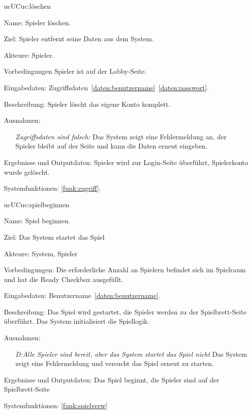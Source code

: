 \begin{description}[leftmargin=5em, style=sameline]
	\begin{lhp}{uc}{UC}{uc:löschen}
		\item [Name:] Spieler löschen.
		\item [Ziel:] Spieler entfernt seine Daten aus dem System.
		\item [Akteure:] Spieler.
		\item [Vorbedingungen] Spieler ist auf der Lobby-Seite.
		\item [Eingabedaten:] Zugriffsdaten~\ref{daten:benutzername}~\ref{daten:passwort}.
		\item [Beschreibung:] Spieler löscht das eigene Konto komplett.
		\item [Ausnahmen:] \hfill
			\begin{itemize} 
				\item[] \textit{Zugriffsdaten sind falsch:} Das System zeigt eine Fehlermeldung an, der Spieler bleibt auf der Seite und kann die Daten erneut eingeben.
			\end{itemize}
		\item [Ergebnisse und Outputdaten:] Spieler wird zur Login-Seite überführt, Spielerkonto wurde gelöscht.	
		\item [Systemfunktionen:] \ref{funk:zugriff}.
	\end{lhp}
    
    \begin{lhp}{uc}{UC}{uc:spielbeginnen}
    \item [Name:] Spiel beginnen.
    \item [Ziel:] Das System startet das Spiel
    \item [Akteure:] System, Spieler
    \item [Vorbedingungen:] Die erforderliche Anzahl an Spielern befindet sich im Spielraum und hat die Ready Checkbox ausgefüllt.
    \item [Eingabedaten:] Benutzername~\ref{daten:benutzername}.
    \item [Beschreibung:] Das Spiel wird gestartet, die Spieler werden zu der Spielbrett-Seite überführt. Das System initialisiert die Spiellogik.
    \item [Ausnahmen:] \hfill
        \begin{itemize}
            \item[] \textit{D:Alle Spieler sind bereit, aber das System startet das Spiel nicht} Das System zeigt eine Fehlermeldung und versucht das Spiel erneut zu starten.
        \end{itemize}
    \item [Ergebnisse und Outputdaten:] Das Spiel beginnt, die Spieler sind auf der Spielbrett-Seite
    \item [Systemfunktionen:] \ref{funk:spielverw}
    \end{lhp}


\end{description}
